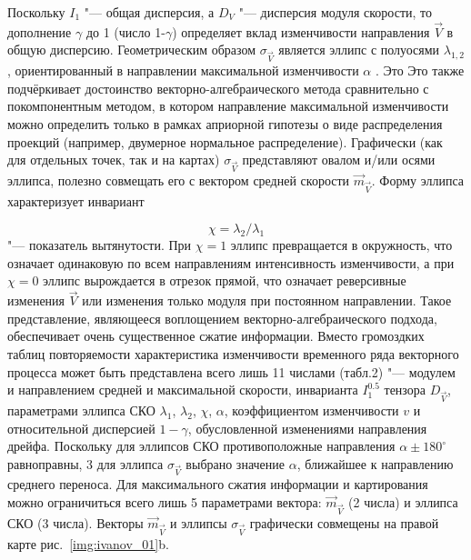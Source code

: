 {{Поскольку $I_1$  "---  общая дисперсия, а $D_V$  "---  дисперсия модуля скорости, то дополнение $\gamma$ до 1 (число 1-$\gamma$) определяет вклад изменчивости направления $\vec{V}$ в общую дисперсию.
Геометрическим образом $\sigma_{\vec{V}}$ является эллипс с полуосями $\lambda_{1,2}$ , ориентированный в направлении максимальной изменчивости $\alpha$ . Это Это также подчёркивает достоинство векторно-алгебраического метода сравнительно с покомпонентным методом, в котором направление максимальной изменчивости можно определить только в рамках априорной гипотезы о виде распределения проекций (например, двумерное нормальное распределение). Графически (как для отдельных точек, так и на картах) $\sigma_{\vec{V}}$ представляют овалом и/или осями эллипса, полезно совмещать его с вектором средней скорости $\vec{m}_{\vec{V}}$. Форму эллипса характеризует инвариант
	
\begin{equation}
\label{eq:equation3_13}
\chi=\lambda_{2}/\lambda_{1}
\end{equation} "--- показатель вытянутости. При $\chi=1$ эллипс превращается в окружность, что означает одинаковую по всем направлениям интенсивность изменчивости, а при $\chi=0$ эллипс вырождается в отрезок прямой, что означает реверсивные изменения $\vec{V}$ или изменения только модуля при постоянном направлении.
 Такое представление, являющееся воплощением векторно-алгебраического подхода, обеспечивает очень существенное сжатие информации. Вместо громоздких таблиц повторяемости характеристика изменчивости временного ряда векторного процесса может быть представлена всего лишь 11 числами (табл.2)  "---  модулем и направлением средней и максимальной скорости, инварианта $I^{0.5}_1$ тензора $D_{\vec{V}}$, параметрами эллипса СКО $\lambda_1$, $\lambda_2$, $\chi$, $\alpha$, коэффициентом изменчивости $v$ и относительной дисперсией $1-\gamma$, обусловленной изменениями направления дрейфа. Поскольку для эллипсов СКО противоположные направления $\alpha\pm180^{\circ}$ равноправны, 3 для эллипса $\sigma_{\vec{V}}$ выбрано значение $\alpha$, ближайшее к направлению среднего переноса. Для максимального сжатия информации и картирования можно ограничиться всего лишь 5 параметрами вектора: $\vec{m}_{\vec{V}}$ (2 числа) и эллипса СКО (3 числа). Векторы $\vec{m}_{\vec{V}}$ и эллипсы $\sigma_{\vec{V}}$ графически совмещены на правой карте рис.~\ref{img:ivanov_01}b.
 
}}
